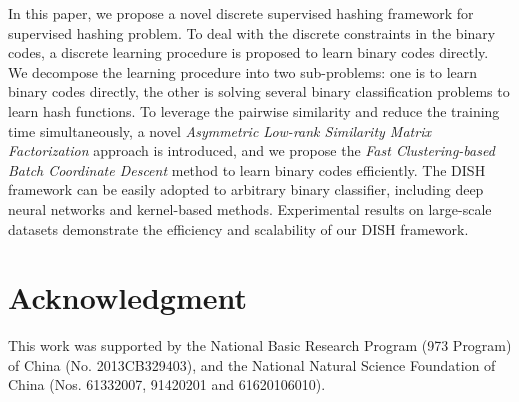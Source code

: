 \documentclass[conference]{IEEEtran}
\begin{document}
In this paper, we propose a novel discrete supervised hashing framework for supervised hashing problem. To deal with the discrete constraints in the binary codes, a discrete learning procedure is proposed to learn binary codes directly. We decompose the learning procedure into two sub-problems: one is to learn binary codes directly, the other is solving several binary classification problems to learn hash functions. To leverage the pairwise similarity and reduce the training time simultaneously, a novel {\em Asymmetric Low-rank Similarity Matrix Factorization} approach is introduced, and we propose the {\em Fast Clustering-based Batch Coordinate Descent} method to learn binary codes efficiently. The DISH framework can be easily adopted to arbitrary binary classifier, including deep neural networks and kernel-based methods. Experimental results on large-scale datasets demonstrate the efficiency and scalability of our DISH framework.

\section*{Acknowledgment}

This work was supported by the National Basic Research Program (973 Program) of China (No. 2013CB329403), and the National Natural Science Foundation of China (Nos. 61332007, 91420201 and 61620106010).



\end{document}

